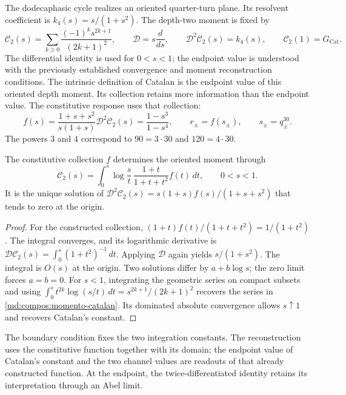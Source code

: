 The dodecaphasic cycle realizes an oriented quarter-turn plane. Its
resolvent coefficient is $k_4(s)=s/(1+s^2)$. The depth-two moment is fixed by
\begin{equation}
 \mathcal C_2(s)=\sum_{k\geq0}
 \frac{(-1)^ks^{2k+1}}{(2k+1)^2},\qquad
 \mathcal D=s\frac{d}{ds},\qquad
 \mathcal D^2\mathcal C_2(s)=k_4(s),\qquad
 \mathcal C_2(1)=G_{\mathrm{Cat}}.
 \label{md:compos:momento-catalan}
\end{equation}
The differential identity is used for $0<s<1$; the endpoint value is
understood with the previously established convergence and moment
reconstruction conditions. The intrinsic definition of Catalan is the
endpoint value of this oriented depth moment. Its collection retains more
information than the endpoint value. The constitutive response uses that
collection:
\begin{equation}
 f(s)=\frac{1+s+s^2}{s(1+s)}\mathcal D^2\mathcal C_2(s)
 =\frac{1-s^3}{1-s^4},\qquad
 r_\pm=f(s_\pm),\qquad s_\pm=q_\pm^{30}.
 \label{md:compos:catalan-respuesta}
\end{equation}
The powers $3$ and $4$ correspond to $90=3\cdot30$ and $120=4\cdot30$.
\begin{proposition}
\label{md:compos:inversa-catalan}
The constitutive collection $f$ determines the oriented moment through
\[
 \mathcal C_2(s)=\int_0^s\log\frac{s}{t}\,
 \frac{1+t}{1+t+t^2}f(t)\,dt,\qquad 0<s<1.
\]
It is the unique solution of
$\mathcal D^2\mathcal C_2(s)=s(1+s)f(s)/(1+s+s^2)$
that tends to zero at the origin.
\end{proposition}
\begin{proof}
For the constructed collection,
$(1+t)f(t)/(1+t+t^2)=1/(1+t^2)$. The integral converges, and its
logarithmic derivative is
$\mathcal D\mathcal C_2(s)=\int_0^s(1+t^2)^{-1}\,dt$.
Applying $\mathcal D$ again yields $s/(1+s^2)$. The integral is
$O(s)$ at the origin. Two solutions differ by $a+b\log s$;
the zero limit forces $a=b=0$.
For $s<1$, integrating the geometric series on compact subsets and using
$\int_0^s t^{2k}\log(s/t)\,dt=s^{2k+1}/(2k+1)^2$
recovers the series in \eqref{md:compos:momento-catalan}.
Its dominated absolute convergence allows $s\uparrow1$ and recovers
Catalan's constant.
\end{proof}
The boundary condition fixes the two integration constants.
The reconstruction uses the constitutive function together with its
domain; the endpoint value of Catalan's constant and the two channel
values are readouts of that already constructed function. At the endpoint,
the twice-differentiated identity retains its interpretation through an
Abel limit.

